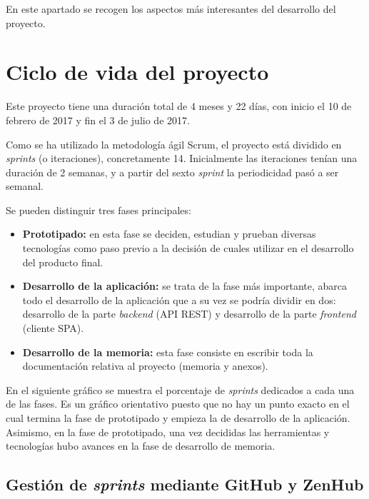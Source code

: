 
En este apartado se recogen los aspectos más interesantes del desarrollo del proyecto.

\section{Ciclo de vida del proyecto}

Este proyecto tiene una duración total de 4 meses y 22 días, con inicio el 10 de febrero de 2017 y fin el 3 de julio de 2017.

Como se ha utilizado la metodología ágil Scrum, el proyecto está dividido en \textit{sprints} (o iteraciones), concretamente 14. Inicialmente las iteraciones tenían una duración de 2 semanas, y a partir del sexto \textit{sprint} la periodicidad pasó a ser semanal.

Se pueden distinguir tres fases principales:

\begin{itemize}
\tightlist
	\item \textbf{Prototipado:} en esta fase se deciden, estudian y prueban diversas tecnologías como paso previo a la decisión de cuales utilizar en el desarrollo del producto final.
	\item \textbf{Desarrollo de la aplicación:} se trata de la fase más importante, abarca todo el desarrollo de la aplicación que a su vez se podría dividir en dos: desarrollo de la parte \textit{backend} (API REST) y desarrollo de la parte \textit{frontend} (cliente SPA).
	\item \textbf{Desarrollo de la memoria:} esta fase consiste en escribir toda la documentación relativa al proyecto (memoria y anexos).
\end{itemize}

En el siguiente gráfico se muestra el porcentaje de \textit{sprints} dedicados a cada una de las fases. Es un gráfico orientativo puesto que no hay un punto exacto en el cual termina la fase de prototipado y empieza la de desarrollo de la aplicación. Asimismo, en la fase de prototipado, una vez decididas las herramientas y tecnologías hubo avances en la fase de desarrollo de memoria.


\subsection{Gestión de \textit{sprints} mediante GitHub y ZenHub}

